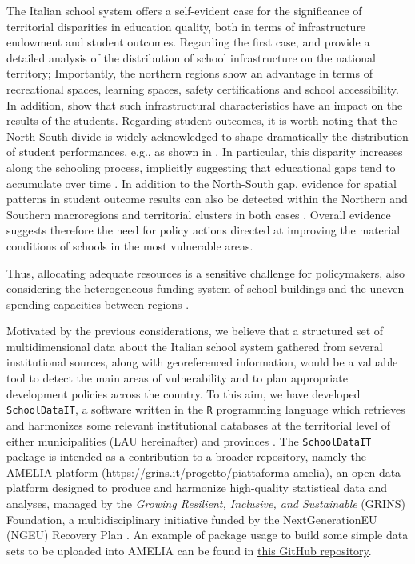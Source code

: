 \documentclass[openany]{book}
\begin{document}
The Italian school system offers a self-evident case for the significance of territorial disparities in education quality, both in terms of infrastructure endowment and student outcomes. Regarding the first case,  \cite{Garlaschi} and \cite{BDI} provide a detailed analysis of the distribution of school infrastructure on the national territory; Importantly, the northern regions show an advantage in terms of recreational spaces, learning spaces, safety certifications and school accessibility. In addition, \cite{BDI} show that such infrastructural characteristics have an impact on the results of the students. Regarding student outcomes, it is worth noting that the North-South divide is widely acknowledged to shape dramatically the distribution of student performances, e.g., as shown in \cite{Agasisti}. In particular, this disparity increases along the schooling process, implicitly suggesting that educational gaps tend to accumulate over time \citep{Invalsi2020}. In addition to the North-South gap,  evidence for spatial patterns in student outcome results can also be detected within the Northern and Southern macroregions and territorial clusters in both cases \citep[][respectively]{bag:do:north, do:bag:mar:south}. Overall evidence suggests therefore the need for policy actions directed at improving the material conditions of schools in the most vulnerable areas.

Thus, allocating adequate resources is a sensitive challenge for policymakers, also considering the heterogeneous funding system of school buildings and the uneven spending capacities between regions \citep[as in the case of Northern special statute regions, see][]{BDI}.

Motivated by the previous considerations, we believe that a structured set of multidimensional data about the Italian school system gathered from several institutional sources, along with georeferenced information, would be a valuable tool to detect the main areas of vulnerability and to plan appropriate development policies across the country. To this aim, we have developed \texttt{SchoolDataIT}, a software written in the \texttt{R} programming language \citep{R} which retrieves and harmonizes some relevant institutional databases at the territorial level of either municipalities (LAU hereinafter) and provinces \citep[NUTS-3 henceforth, ][]{NUTS2024}. 
The \texttt{SchoolDataIT} package is intended as a contribution to a broader repository, namely the AMELIA platform (\url{https://grins.it/progetto/piattaforma-amelia}), an open-data platform designed to produce and harmonize high-quality statistical data and analyses, managed by the \textit{Growing Resilient, Inclusive, and Sustainable} (GRINS) Foundation, a multidisciplinary initiative funded by the NextGenerationEU (NGEU) Recovery Plan \citep{CrescenziEtAl2021, DeLaPorteJensen2021}. An example of package usage to build some simple data sets to be uploaded into AMELIA can be found in \href{https://github.com/lcef97/AMELIA_datasets}{this GitHub repository}.
\end{document}
